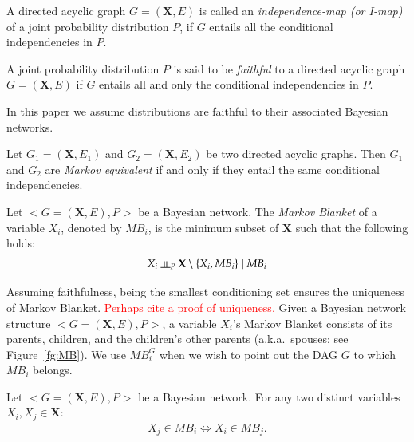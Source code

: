 \documentclass{svmult}
\begin{document}
\begin{definition}[I-map]
\label{def:imap}
A directed acyclic graph $G=(\mathbf{X},E)$ is called an
\textit{independence-map (or I-map)} of a joint probability
distribution $P$, if $G$ entails all the conditional independencies in
$P$.
\end{definition}

\begin{definition}[Faithfulness]
\label{def:faithful}
A joint probability distribution $P$ is said to be \textit{faithful}
to a directed acyclic graph $G=(\mathbf{X},E)$ if $G$ entails all and only the
conditional independencies in $P$.
\end{definition}

\noindent
In this paper we assume distributions are faithful to their associated
Bayesian networks.

\begin{definition}
\label{def:equivalent}
Let $G_1=(\mathbf{X},E_1)$ and $G_2=(\mathbf{X},E_2)$ be two directed acyclic
graphs. Then $G_1$ and $G_2$ are \textit{Markov equivalent} if and
only if they entail the same conditional independencies.
\end{definition}

\begin{definition}
\label{def:mb}
Let $<G=(\mathbf{X},E),P>$ be a Bayesian network. The \textit{Markov Blanket}
of a variable $X_i$, denoted by $MB_i$, is the minimum subset of
$\mathbf{X}$ such that the following holds:
\begin{align*}
X_i \indep_P ~ \mathbf{X}\setminus \{X_i, MB_i\} \mid MB_i
\end{align*}
\end{definition}

Assuming faithfulness, being the smallest conditioning set ensures the
uniqueness of Markov Blanket. \textcolor{red}{Perhaps cite a proof of
  uniqueness.}  Given a Bayesian network structure
$<G=(\mathbf{X}, E), P>$, a variable $X_i$'s Markov Blanket consists
of its parents, children, and the children's other parents
(a.k.a.~spouses; see Figure~\ref{fg:MB}). We use $MB^G_i$ when we wish
to point out the DAG $G$ to which $MB_i$ belongs.

\begin{proposition}[Symmetry]
\label{prop:sym}
Let $<G=(\mathbf{X},E),P>$ be a Bayesian network. For any two distinct
variables $X_i, X_j \in \mathbf{X}$:
\begin{align*}
X_j \in MB_i \Leftrightarrow X_i \in MB_j.
\end{align*}
\end{proposition}
\end{document}
